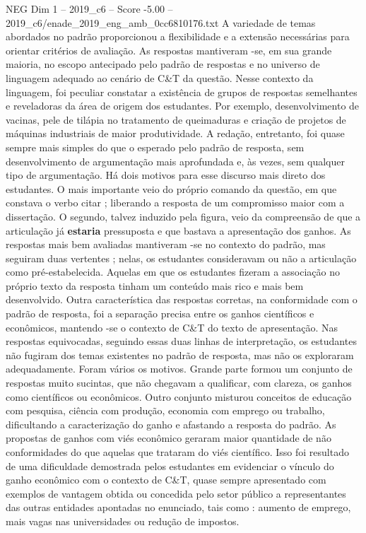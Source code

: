 \begin{textsample}{NEG Dim 1 – 2019\_c6 – Score -5.00 – 2019\_c6/enade\_2019\_eng\_amb\_0cc6810176.txt}
A variedade de temas abordados no padrão proporcionou a flexibilidade e a extensão necessárias para orientar critérios de avaliação.
As respostas mantiveram -se, em sua grande maioria, no escopo antecipado pelo padrão de respostas e no universo de linguagem adequado ao cenário de C\&T da questão.
Nesse contexto da linguagem, foi peculiar constatar a existência de grupos de respostas semelhantes e reveladoras da área de origem dos estudantes.
Por exemplo, desenvolvimento de vacinas, pele de tilápia no tratamento de queimaduras e criação de projetos de máquinas industriais de maior produtividade.
A redação, entretanto, foi quase sempre mais simples do que o esperado pelo padrão de resposta, sem desenvolvimento de argumentação mais aprofundada e, às vezes, sem qualquer tipo de argumentação.
Há dois motivos para esse discurso mais direto dos estudantes.
O mais importante veio do próprio comando da questão, em que constava o verbo citar ; liberando a resposta de um compromisso maior com a dissertação.
O segundo, talvez induzido pela figura, veio da compreensão de que a articulação já \textbf{estaria} pressuposta e que bastava a apresentação dos ganhos.
As respostas mais bem avaliadas mantiveram -se no contexto do padrão, mas seguiram duas vertentes ; nelas, os estudantes consideravam ou não a articulação como pré-estabelecida.
Aquelas em que os estudantes fizeram a associação no próprio texto da resposta tinham um conteúdo mais rico e mais bem desenvolvido.
Outra característica das respostas corretas, na conformidade com o padrão de resposta, foi a separação precisa entre os ganhos científicos e econômicos, mantendo -se o contexto de C\&T do texto de apresentação.
Nas respostas equivocadas, seguindo essas duas linhas de interpretação, os estudantes não fugiram dos temas existentes no padrão de resposta, mas não os exploraram adequadamente.
Foram vários os motivos.
Grande parte formou um conjunto de respostas muito sucintas, que não chegavam a qualificar, com clareza, os ganhos como científicos ou econômicos.
Outro conjunto misturou conceitos de educação com pesquisa, ciência com produção, economia com emprego ou trabalho, dificultando a caracterização do ganho e afastando a resposta do padrão.
As propostas de ganhos com viés econômico geraram maior quantidade de não conformidades do que aquelas que trataram do viés científico.
Isso foi resultado de uma dificuldade demostrada pelos estudantes em evidenciar o vínculo do ganho econômico com o contexto de C\&T, quase sempre apresentado com exemplos de vantagem obtida ou concedida pelo setor público a representantes das outras entidades apontadas no enunciado, tais como : aumento de emprego, mais vagas nas universidades ou redução de impostos.

\end{textsample}

